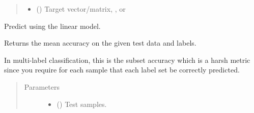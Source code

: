 \documentclass[letterpaper,10pt,english]{sphinxmanual}
\begin{document}
{\begin{fulllineitems}
\begin{fulllineitems}
\begin{quote}
\begin{description}
\begin{itemize}
\item {} 
 () \textendash{} Target vector/matrix, ,
or 

\end{itemize}

\end{description}\end{quote}

\end{fulllineitems}


\begin{fulllineitems}
\label{\detokenize{api_reference:group_lasso.MultinomialGroupLasso.predict}}
Predict using the linear model.

\end{fulllineitems}


\begin{fulllineitems}
\label{\detokenize{api_reference:group_lasso.MultinomialGroupLasso.score}}
Returns the mean accuracy on the given test data and labels.

In multi-label classification, this is the subset accuracy
which is a harsh metric since you require for each sample that
each label set be correctly predicted.
\begin{quote}\begin{description}
\item[{Parameters}] \leavevmode\begin{itemize}
\item {} 
 (\sphinxstyleliteralemphasis{\sphinxupquote{, }}\sphinxstyleliteralemphasis{\sphinxupquote{ (}}\sphinxstyleliteralemphasis{\sphinxupquote{, }}\sphinxstyleliteralemphasis{\sphinxupquote{)}}) \textendash{} Test samples.


\end{itemize}
\end{description}
\end{quote}
\end{fulllineitems}
\end{fulllineitems}}
\end{document}

